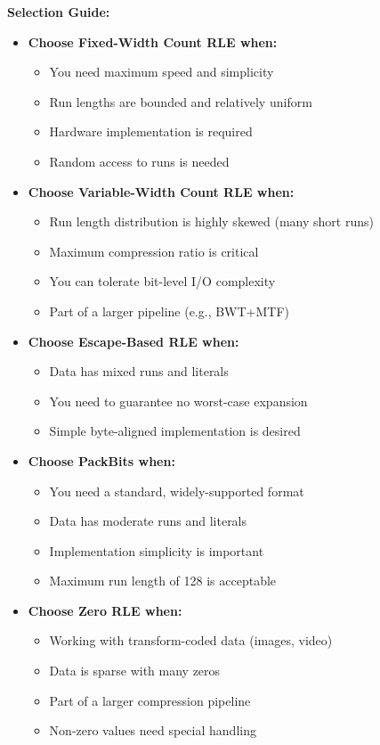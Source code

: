 \begin{importantbox}
\textbf{Selection Guide:}

\begin{itemize}
    \item \textbf{Choose Fixed-Width Count RLE when:}
    \begin{itemize}
        \item You need maximum speed and simplicity
        \item Run lengths are bounded and relatively uniform
        \item Hardware implementation is required
        \item Random access to runs is needed
    \end{itemize}
    
    \item \textbf{Choose Variable-Width Count RLE when:}
    \begin{itemize}
        \item Run length distribution is highly skewed (many short runs)
        \item Maximum compression ratio is critical
        \item You can tolerate bit-level I/O complexity
        \item Part of a larger pipeline (e.g., BWT+MTF)
    \end{itemize}
    
    \item \textbf{Choose Escape-Based RLE when:}
    \begin{itemize}
        \item Data has mixed runs and literals
        \item You need to guarantee no worst-case expansion
        \item Simple byte-aligned implementation is desired
    \end{itemize}
    
    \item \textbf{Choose PackBits when:}
    \begin{itemize}
        \item You need a standard, widely-supported format
        \item Data has moderate runs and literals
        \item Implementation simplicity is important
        \item Maximum run length of 128 is acceptable
    \end{itemize}
    
    \item \textbf{Choose Zero RLE when:}
    \begin{itemize}
        \item Working with transform-coded data (images, video)
        \item Data is sparse with many zeros
        \item Part of a larger compression pipeline
        \item Non-zero values need special handling
    \end{itemize}
\end{itemize}
\end{importantbox}

